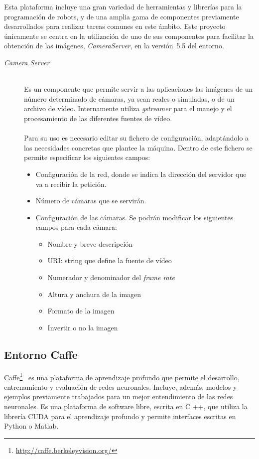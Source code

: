Esta plataforma incluye una gran variedad de herramientas y librerías para la programación de robots, y de una amplia gama de componentes previamente desarrollados para realizar tareas comunes en este ámbito. Este proyecto únicamente se centra en la utilización de uno de sus componentes para facilitar la obtención de las imágenes, \textit{CameraServer}, en la versión~5.5 del entorno. 
\vspace{10pt}
\begin{description}
\item[\textit{Camera Server}] \hfill 
\vspace{10pt}
\\
Es un componente que permite servir a las aplicaciones las imágenes de un número determinado de cámaras, ya sean reales o simuladas, o de un archivo de vídeo. Internamente utiliza \textit{gstreamer} para el manejo y el procesamiento de las diferentes fuentes de vídeo.\\
\vspace{-10pt}
\\
Para su uso es necesario editar su fichero de configuración, adaptándolo a las necesidades concretas que plantee la máquina. Dentro de este fichero se permite especificar los siguientes campos:\\
\vspace{-20pt}
\begin{itemize}
    \item Configuración de la red, donde se indica la dirección del servidor que va a recibir la petición.
    \item Número de cámaras que se servirán.
    \item Configuración de las cámaras. Se podrán modificar los siguientes campos para cada cámara:
    \begin{itemize}
         \item Nombre y breve descripción
         \item URI: string que define la fuente de vídeo
     	 \item Numerador y denominador del \textit{frame rate}
         \item Altura y anchura de la imagen
         \item Formato de la imagen
         \item Invertir o no la imagen 
    \end{itemize}
\end{itemize}
\end{description}

\subsection{Entorno Caffe}\label{sec.caffe}
Caffe\footnote{\url{http://caffe.berkeleyvision.org/}}~\cite{jia2014caffe} es una plataforma de aprendizaje profundo que permite el desarrollo, entrenamiento y evaluación de redes neuronales. Incluye, además, modelos y ejemplos previamente trabajados para un mejor entendimiento de las redes neuronales. Es una plataforma de software libre, escrita en C ++, que utiliza la librería CUDA para el aprendizaje profundo y permite interfaces escritas en Python o Matlab.\\ 

